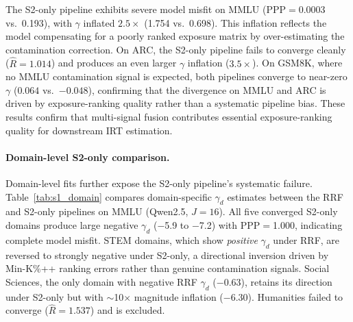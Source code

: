 The S2-only pipeline exhibits severe model misfit on MMLU (PPP$=$0.0003 vs.\ 0.193), with $\gamma$ inflated $2.5\times$ (1.754 vs.\ 0.698). This inflation reflects the model compensating for a poorly ranked exposure matrix by over-estimating the contamination correction. On ARC, the S2-only pipeline fails to converge cleanly ($\hat{R}=1.014$) and produces an even larger $\gamma$ inflation ($3.5\times$). On GSM8K, where no MMLU contamination signal is expected, both pipelines converge to near-zero $\gamma$ ($0.064$ vs.\ $-0.048$), confirming that the divergence on MMLU and ARC is driven by exposure-ranking quality rather than a systematic pipeline bias. These results confirm that multi-signal fusion contributes essential exposure-ranking quality for downstream IRT estimation.

\paragraph{Domain-level S2-only comparison.}
Domain-level fits further expose the S2-only pipeline's systematic failure. Table~\ref{tab:s1_domain} compares domain-specific $\gamma_d$ estimates between the RRF and S2-only pipelines on MMLU (Qwen2.5, $J\!=\!16$). All five converged S2-only domains produce large negative $\gamma_d$ ($-$5.9 to $-$7.2) with PPP$=$1.000, indicating complete model misfit. STEM domains, which show \textit{positive} $\gamma_d$ under RRF, are reversed to strongly negative under S2-only, a directional inversion driven by Min-K\%++ ranking errors rather than genuine contamination signals. Social Sciences, the only domain with negative RRF $\gamma_d$ ($-$0.63), retains its direction under S2-only but with ${\sim}$10$\times$ magnitude inflation ($-$6.30). Humanities failed to converge ($\hat{R}=1.537$) and is excluded.

\begin{table}[h]
\centering
\caption{Domain-level $\gamma_d$: RRF vs.\ S2-only pipeline (MMLU, Qwen2.5, $J\!=\!16$). S2-only produces uniformly negative, inflated estimates with PPP$=$1.000 across all domains.}
\label{tab:s1_domain}
\footnotesize
\setlength{\tabcolsep}{3pt}
\end{table}

